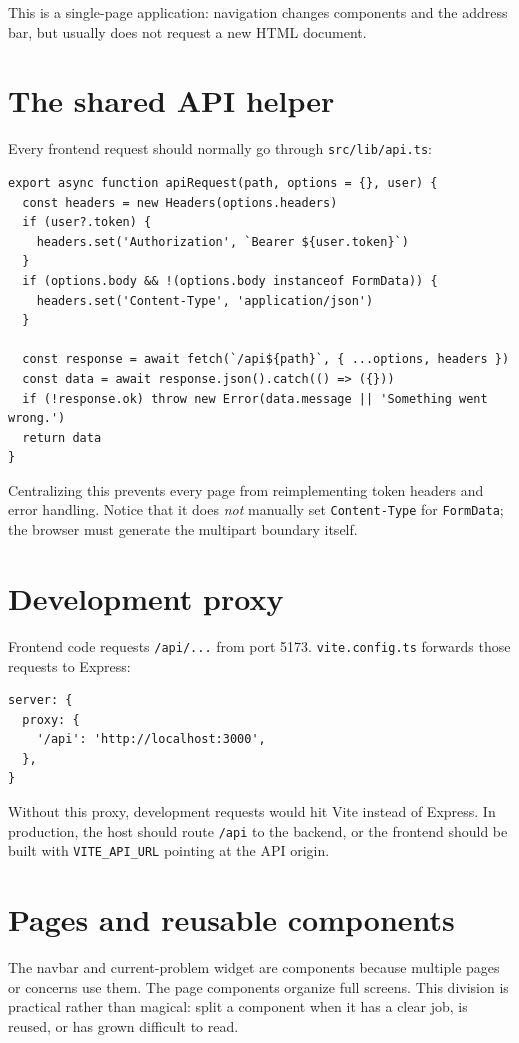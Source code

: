 \documentclass[11pt,oneside]{book}
\newcommand{\file}[1]{\texttt{#1}}
\newcommand{\route}[1]{\texttt{#1}}
\newcommand{\code}[1]{\texttt{#1}}
\begin{document}
This is a single-page application: navigation changes components and the address bar, but usually does not request a new HTML document.

\section{The shared API helper}
Every frontend request should normally go through \file{src/lib/api.ts}:

\begin{lstlisting}[title={src/lib/api.ts, shortened}]
export async function apiRequest(path, options = {}, user) {
  const headers = new Headers(options.headers)
  if (user?.token) {
    headers.set('Authorization', `Bearer ${user.token}`)
  }
  if (options.body && !(options.body instanceof FormData)) {
    headers.set('Content-Type', 'application/json')
  }

  const response = await fetch(`/api${path}`, { ...options, headers })
  const data = await response.json().catch(() => ({}))
  if (!response.ok) throw new Error(data.message || 'Something went wrong.')
  return data
}
\end{lstlisting}

Centralizing this prevents every page from reimplementing token headers and error handling. Notice that it does \emph{not} manually set \code{Content-Type} for \code{FormData}; the browser must generate the multipart boundary itself.

\section{Development proxy}
Frontend code requests \route{/api/...} from port 5173. \file{vite.config.ts} forwards those requests to Express:

\begin{lstlisting}[title={vite.config.ts}]
server: {
  proxy: {
    '/api': 'http://localhost:3000',
  },
}
\end{lstlisting}

Without this proxy, development requests would hit Vite instead of Express. In production, the host should route \route{/api} to the backend, or the frontend should be built with \code{VITE\_API\_URL} pointing at the API origin.

\section{Pages and reusable components}
The navbar and current-problem widget are components because multiple pages or concerns use them. The page components organize full screens. This division is practical rather than magical: split a component when it has a clear job, is reused, or has grown difficult to read.
\end{document}
